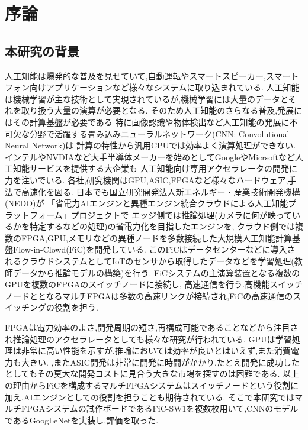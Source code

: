 \chapter{序論}
{
  \label{chap:introducion}

  \section{本研究の背景}
  \label{sec:backgroud}
  人工知能は爆発的な普及を見せていて,自動運転やスマートスピーカー,スマートフォン向けアプリケーションなど様々なシステムに取り込まれている.
  人工知能は機械学習が主な技術として実現されているが,機械学習には大量のデータとそれを取り扱う大量の演算が必要となる.
  そのため人工知能のさらなる普及,発展にはその計算基盤が必要である
  特に画像認識や物体検出など人工知能の発展に不可欠な分野で活躍する畳み込みニューラルネットワーク(CNN: Convolutional Neural Network)は
  計算の特性から汎用CPUでは効率よく演算処理ができない.
  インテルやNVDIAなど大手半導体メーカーを始めとしてGoogleやMicrsoftなど人工知能サービスを提供する大企業も
  人工知能向け専用アクセラレータの開発に力を注いでいる.
  各社,研究機関はGPU,ASIC,FPGAなど様々なハードウェア,手法で高速化を図る.
  日本でも国立研究開発法人新エネルギー・産業技術開発機構(NEDO)が
  「省電力AIエンジンと異種エンジン統合クラウドによる人工知能プラットフォーム」プロジェクトで
  エッジ側では推論処理(カメラに何が映っているかを特定するなどの処理)の省電力化を目指したエンジンを,
  クラウド側では複数のFPGA,GPU,メモリなどの異種ノードを多数接続した大規模人工知能計算基盤Flow-in-Clowd(FiC)を開発している.
  このFiCはデータセンターなどに導入されるクラウドシステムとしてIoTのセンサから取得したデータなどを学習処理(教師データから推論モデルの構築)を行う.
  FiCシステムの主演算装置となる複数のGPUを複数のFPGAのスイッチノードに接続し,
  高速通信を行う.高機能スイッチノードととなるマルチFPGAは多数の高速リンクが接続され,FiCの高速通信のスイッチングの役割を担う.

  FPGAは電力効率のよさ,開発周期の短さ,再構成可能であることなどから注目され推論処理のアクセラレータとしても様々な研究が行われている.
  GPUは学習処理は非常に高い性能を示すが,推論においては効率が良いとはいえず,また消費電力も大きい.
  ,またASIC開発は非常に開発に時間がかかり,たとえ開発に成功したとしてもその莫大な開発コストに見合う大きな市場を探すのは困難である.
  以上の理由からFiCを構成するマルチFPGAシステムはスイッチノードという役割に加え,AIエンジンとしての役割を担うことも期待されている.
  そこで本研究ではマルチFPGAシステムの試作ボードであるFiC-SW1を複数枚用いて,CNNのモデルであるGoogLeNetを実装し,評価を取った.

}
